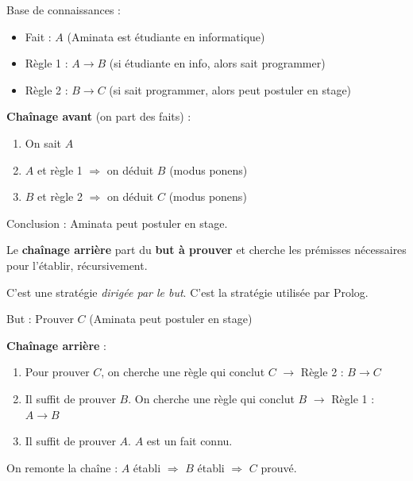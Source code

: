 \documentclass[11pt,a4paper]{article}
\newcommand{\cmark}{\ding{51}}
\begin{document}
\begin{exemplebox}
Base de connaissances :
\begin{itemize}[nosep]
    \item Fait : $A$ (Aminata est étudiante en informatique)
    \item Règle 1 : $A \rightarrow B$ (si étudiante en info, alors sait programmer)
    \item Règle 2 : $B \rightarrow C$ (si sait programmer, alors peut postuler en stage)
\end{itemize}

\textbf{Chaînage avant} (on part des faits) :
\begin{enumerate}[nosep]
    \item On sait $A$
    \item $A$ et règle 1 $\Rightarrow$ on déduit $B$ (modus ponens)
    \item $B$ et règle 2 $\Rightarrow$ on déduit $C$ (modus ponens)
\end{enumerate}
Conclusion : Aminata peut postuler en stage.
\end{exemplebox}

\begin{definitionbox}
Le \textbf{chaînage arrière} part du \textbf{but à prouver} et cherche les prémisses nécessaires pour l'établir, récursivement.

C'est une stratégie \textit{dirigée par le but}. C'est la stratégie utilisée par Prolog.
\end{definitionbox}

\begin{exemplebox}
But : Prouver $C$ (Aminata peut postuler en stage)

\textbf{Chaînage arrière} :
\begin{enumerate}[nosep]
    \item Pour prouver $C$, on cherche une règle qui conclut $C$ $\to$ Règle 2 : $B \rightarrow C$
    \item Il suffit de prouver $B$. On cherche une règle qui conclut $B$ $\to$ Règle 1 : $A \rightarrow B$
    \item Il suffit de prouver $A$. $A$ est un fait connu. \cmark
\end{enumerate}
On remonte la chaîne : $A$ établi $\Rightarrow$ $B$ établi $\Rightarrow$ $C$ prouvé.
\end{exemplebox}
\end{document}
